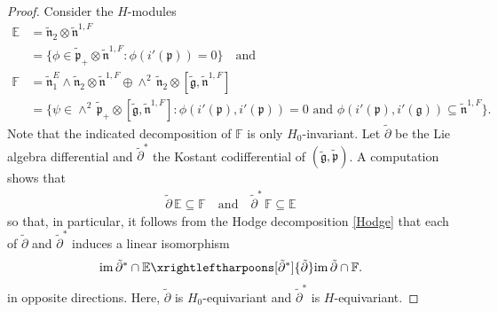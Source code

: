\documentclass[11pt]{amsart}
\begin{document}
\begin{proof}
Consider the $H$-modules
\begin{align*}
   \mathbb E&=\tilde{\mathfrak n}_{2}\otimes\tilde{\mathfrak n}^{1,F}\\
    &=\{\phi\in \tilde{\mathfrak p}_+\otimes\tilde{\mathfrak n}^{1,F}:\phi(i'(\mathfrak p))=0\}\quad\text{and}\\
    \mathbb F&=\tilde{\mathfrak n}_{1}^E\wedge\tilde{\mathfrak n}_{2}\otimes\tilde{\mathfrak n}^{1,F}\oplus\wedge^2\,\tilde{\mathfrak n}_{2}\otimes[\tilde{\mathfrak g},\tilde{\mathfrak n}^{1,F}]\\
    &=\{\psi\in \wedge^2\,\tilde{\mathfrak p}_+\otimes[\tilde{\mathfrak g},\tilde{\mathfrak n}^{1,F}]:\phi(i'(\mathfrak p),i'(\mathfrak p))=0\text{ and }\phi(i'(\mathfrak p),i'(\mathfrak g))\subseteq \tilde{\mathfrak n}^{1,F}\}.
\end{align*}
Note that the indicated decomposition of $\mathbb F$ is only $H_0$-invariant. Let $\tilde\partial$ be the Lie algebra differential and $\tilde\partial^*$ the Kostant codifferential of $(\tilde{\mathfrak g},\tilde{\mathfrak p})$. A computation shows that
\begin{align}\label{stability between E and F}
    \tilde\partial\,\mathbb E\subseteq\mathbb F\quad\text{and}\quad
    \tilde\partial^*\,\mathbb F\subseteq \mathbb E
\end{align}
so that, in particular, it follows from the Hodge decomposition \eqref{Hodge} that each of $\tilde\partial$ and $\tilde\partial^*$ induces a linear isomorphism
\begin{align}\label{isomorphism in Hodge}
    \mathrm{im}\,\tilde\partial^*\cap\mathbb E\xrightleftharpoons[\tilde\partial^*]{\tilde\partial}
\mathrm{im}\,\tilde\partial\cap\mathbb F.
\end{align}
in opposite directions. Here, $\tilde\partial$ is $H_0$-equivariant and $\tilde\partial^*$ is $H$-equivariant.


\end{proof}
\end{document}
